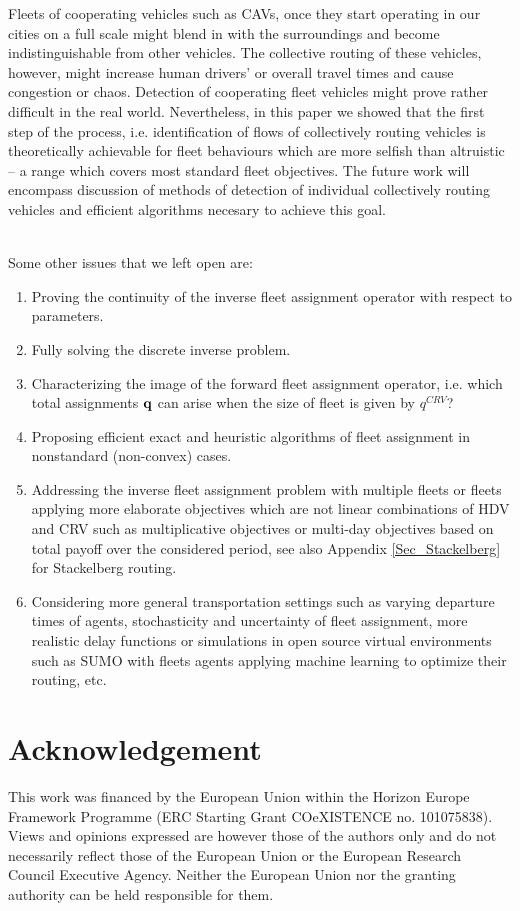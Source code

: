 \documentclass[a4paper,11pt]{article}
\begin{document}
\noindent Fleets of cooperating vehicles such as CAVs, once they start operating in our cities on a full scale might blend in with the surroundings and become indistinguishable from other vehicles. The collective routing of these vehicles, however, might increase human drivers' or overall travel times and cause congestion or chaos. 
Detection of cooperating fleet vehicles might prove rather difficult in the real world. 
Nevertheless, in this paper we showed that the first step of the process, i.e. identification of flows of collectively routing vehicles is theoretically achievable for fleet behaviours which are more selfish than altruistic -- a range which covers most standard fleet objectives. The future work \cite{JamrozDetectionInPrep} will encompass discussion of methods of detection of individual collectively routing vehicles and efficient algorithms necesary to achieve this goal. 

\,\\
\noindent Some other issues that we left open are: 
\begin{enumerate}
\item[i)] Proving the continuity of the inverse fleet assignment operator with respect to parameters. 
\item[ii)] Fully solving the discrete inverse problem. 
\item[iii)] Characterizing the image of the forward fleet assignment operator, i.e. which total assignments $\bold{q}$ can arise when the size of fleet is given by $q^{CRV}$?   
\item[iv)] Proposing efficient exact and heuristic algorithms of fleet assignment in nonstandard (non-convex) cases.  
\item[v)] Addressing the inverse fleet assignment problem with multiple fleets or fleets applying more elaborate objectives which are not linear combinations of HDV and CRV such as multiplicative objectives or multi-day objectives based on total payoff over the considered period, see also Appendix \ref{Sec_Stackelberg} for Stackelberg routing.
\item[vi)] Considering more general transportation settings such as varying departure times of agents, stochasticity and uncertainty of fleet assignment, more realistic delay functions or simulations in open source virtual environments such as SUMO \cite{SUMO} with fleets agents applying machine learning to optimize their routing, \cite{Akman2024, Akman2} etc. 
\end{enumerate}

\section*{Acknowledgement}
This work was financed by the European Union within the Horizon Europe Framework Programme (ERC Starting Grant COeXISTENCE no. 101075838). Views and opinions expressed are however those of the authors only and do not necessarily reflect those of the European Union or the European Research Council Executive Agency. Neither the European Union nor the granting authority can be held responsible for them.
\end{document}
